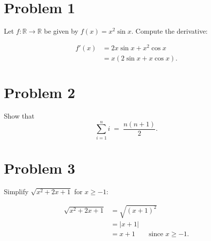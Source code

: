\documentclass[11pt]{article}
\begin{document}
\itshape

\section*{Problem 1}

Let $f:\mathbb{R}\to\mathbb{R}$ be given by $f(x)=x^{2}\sin x$.
Compute the derivative:

\begin{align*}
    f'(x) &= 2x\sin x + x^{2}\cos x \\
          &= x\left(2\sin x + x\cos x\right).
\end{align*}

\section*{Problem 2}

Show that
\[
    \sum_{i=1}^{n} i \;=\; \frac{n(n+1)}{2}.
\]

\section*{Problem 3}

Simplify $\sqrt{x^{2}+2x+1}$ for $x \geq -1$:

\begin{align*}
    \sqrt{x^{2}+2x+1} &= \sqrt{(x+1)^{2}} \\
                      &= |x+1| \\
                      &= x+1 \qquad \text{since } x \geq -1.
\end{align*}
\end{document}
